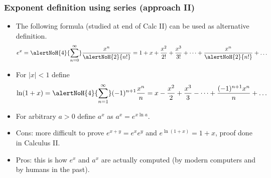 \begin{frame}
\frametitle{Exponent definition using series (approach II)}
\begin{itemize}
\item<1-> The following formula (studied at end of Calc II) can be used as alternative definition.
\[
e^{x}=\alertNoH{4}{\sum_{n=0}^{\infty}} \frac{x^n}{\alertNoH{2}{n!}}= 1+ x+\frac{x^2}{2!}+\frac{x^3}{3!}+\dots + \frac{x^{n}}{\alertNoH{2}{n!}}+\dots
\]
\item<3-> For $|x|<1$ define 
\[
\ln (1+x)=\alertNoH{4}{\sum_{n=1}^{\infty}} (-1)^{n+1}\frac{x^n}{n}=  x-\frac{x^2}{2}+\frac{x^3}{3}-\dots + \frac{(-1)^{n+1}x^{n}}{n}+\dots
\]
\item<5-> For arbitrary $a>0$ define $a^x$ as $a^x=e^{x\ln a}$. 
\item<6-> Cons: more difficult to prove $e^{x+y}= e^{x} e^y$ and $e^{\ln(1+x)}=1+x$, proof done in Calculus II.
\item<7-> Pros: this is how $e^x$ and $a^x$ are actually computed (by modern computers and by humans in the past).
\end{itemize}
\end{frame}

